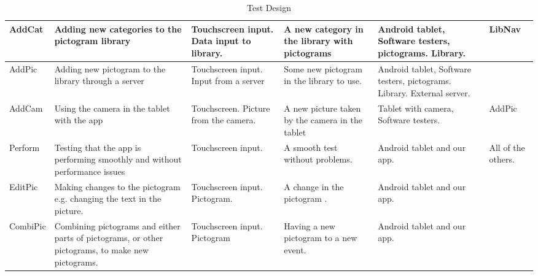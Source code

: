 \begin{sidewaystable}
{\begin{tabular}{|p{2cm}|p{5cm}|p{5cm}|p{5cm}|p{5cm}|p{3cm}|}
        AddCat      & Adding new categories to the pictogram library                                                  & Touchscreen input. Data input to library.            & A new category in the library with pictograms                                     & Android tablet, Software testers,  pictograms.  Library.            & LibNav                              \\ \hline
        AddPic      & Adding new pictogram to the library   through a server                                             & Touchscreen input. Input from a server               & Some new pictogram in the library to use.                                         & Android tablet, Software testers, \newline pictograms. \newline Library. External server. & ~                                   \\ \hline
        AddCam      & Using the camera in the tablet with the app                                                       & Touchscreen.  \newline Picture from the camera.            & A new picture taken by the camera in the tablet                                   & Tablet with camera, Software testers.                                   & AddPic                              \\ \hline
        Perform     & Testing that the app is performing smoothly and without performance issues                         & Touchscreen input.                                   & A smooth test without problems.                                                    & Android tablet and our app.                                             & All of the others.                  \\ \hline
        EditPic     & Making changes to the pictogram e.g. changing the text in the picture.                            & Touchscreen input.  \newline Pictogram.                    & A change in the pictogram .                                                       & Android tablet and our app.                                             & ~                                   \\ \hline
        CombiPic    & Combining pictograms and either parts of pictograms, or other pictograms, to make new pictograms. & Touchscreen \newline  input.  \newline Pictogram                 & Having a new pictogram to a new event.                                            & Android tablet and our app.                                             & ~                                   \\
        \hline
    \end{tabular}}
    \caption{Test Design}
\end{sidewaystable}

